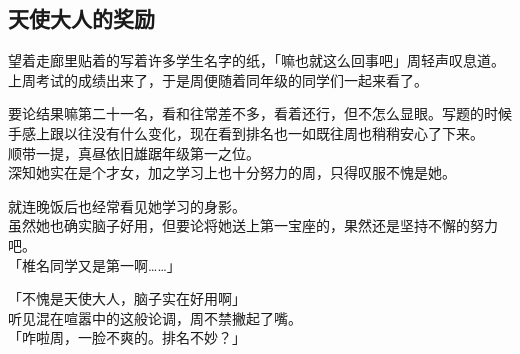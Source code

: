 \subsection{天使大人的奖励}

望着走廊里贴着的写着许多学生名字的纸，「嘛也就这么回事吧」周轻声叹息道。\\

上周考试的成绩出来了，于是周便随着同年级的同学们一起来看了。

要论结果嘛第二十一名，看和往常差不多，看着还行，但不怎么显眼。写题的时候手感上跟以往没有什么变化，现在看到排名也一如既往周也稍稍安心了下来。\\

顺带一提，真昼依旧雄踞年级第一之位。\\

深知她实在是个才女，加之学习上也十分努力的周，只得叹服不愧是她。

就连晚饭后也经常看见她学习的身影。\\

虽然她也确实脑子好用，但要论将她送上第一宝座的，果然还是坚持不懈的努力吧。\\

「椎名同学又是第一啊……」

「不愧是天使大人，脑子实在好用啊」\\

听见混在喧嚣中的这般论调，周不禁撇起了嘴。\\

「咋啦周，一脸不爽的。排名不妙？」\\

